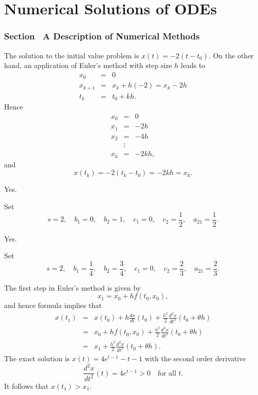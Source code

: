 \chapter{Numerical Solutions of ODEs}

\subsection*{Section~\protect{\ref{sec:DNM}} A Description of Numerical Methods}

 The solution to the initial value problem is
$x(t)=-2(t-t_0)$.  On the other hand, an application of Euler's method
with step size $h$ leads to
\[
\begin{array}{rcl}
x_0 & = & 0 \\
x_{k+1} & = & x_k + h (-2) = x_k - 2h\\
t_k & = & t_0 + kh.
\end{array}
\]
Hence
\[
\begin{array}{rcl}
x_0 & = & 0\\
x_1 & = & -2h\\
x_2 & = & -4h\\
 & \vdots & \\
x_k & = & -2kh,
\end{array}
\]
and
\[
x(t_k) = -2(t_k-t_0) = -2kh = x_k.
\]

 \ans Yes.

\soln Set
\[
s=2,\quad b_1=0,\quad b_2=1,\quad c_1=0,\quad c_2=\frac{1}{2},\quad
a_{21}=\frac{1}{2}.
\]

 \ans Yes.

\soln Set
\[
s=2,\quad b_1=\frac{1}{4},\quad b_2=\frac{3}{4},\quad
c_1=0,\quad c_2=\frac{2}{3},\quad a_{21}=\frac{2}{3}.
\]

 The first step in Euler's method is given by
\[
x_1 = x_0 + hf(t_0,x_0),
\]
and hence formula  implies that
\begin{eqnarray*}
x(t_1) &=&  x(t_0)+h\frac{dx}{dt}(t_0)+
\frac{h^2}{2}\frac{d^2x}{dt^2}(t_0+\theta h)\\
&=& x_0 + hf(t_0,x_0) +\frac{h^2}{2}\frac{d^2x}{dt^2}(t_0+\theta h)\\
&=& x_1 +\frac{h^2}{2}\frac{d^2x}{dt^2}(t_0+\theta h).
\end{eqnarray*}
The exact solution is $x(t)= 4e^{t-1}-t-1$ with the second order
derivative
\[
\frac{d^2x}{dt^2}(t) = 4e^{t-1}>0\quad \mbox{for all $t$.}
\]
It follows that $x(t_1) > x_1$.

